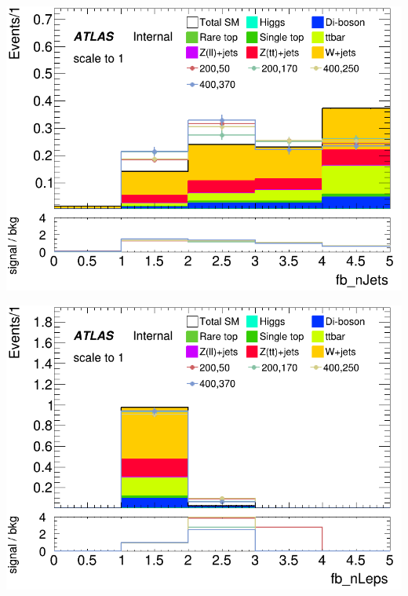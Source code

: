 \documentclass[usenames,dvipsnames]{beamer}
\begin{document}
\begin{frame}
    \begin{minipage}{0.32\textwidth}
        \centering
        \includegraphics[width=\textwidth]{graphics/LH_met_sig/LH_fb_nJets_norm.png}
    \end{minipage}
    \begin{minipage}{0.32\textwidth}
        \centering
        \includegraphics[width=\textwidth]{graphics/LH_met_sig/LH_fb_nLeps_norm.png}
    \end{minipage}
    \hfil
    \begin{minipage}{0.32\textwidth}
        \centering

\end{minipage}
\end{frame}
\end{document}
